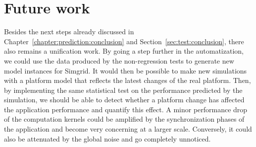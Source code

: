     \section{Future work}%

        Besides the next steps already discussed in Chapter~\ref{chapter:prediction:conclusion} and
        Section~\ref{sec:test:conclusion}, there also remains a unification work. By going a step further in the
        automatization, we could use the data produced by the non-regression tests to generate new model instances for
        Simgrid. It would then be possible to make new simulations with a platform model that reflects the latest
        changes of the real platform. Then, by implementing the same statistical test on the performance predicted by
        the simulation, we should be able to detect whether a platform change has affected the application
        performance and quantify this effect. A minor performance drop of the computation kernels could be amplified by
        the synchronization phases of the application and become very concerning at a larger scale. Conversely, it could
        also be attenuated by the global noise and go completely unnoticed.
